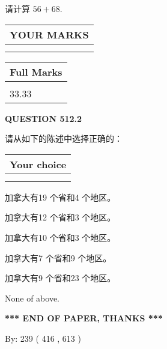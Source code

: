\documentclass{ctexart}
\begin{document}
  
 
请计算 $ %
56 +  %
68 $.
 

 

 
  
\vspace{0.2in}
  
\noindent\begin{tabular}{|l|}
\hline
 YOUR MARKS  \\
\hline
 \\ 
 \\ 
\hline
\end{tabular}
\hspace{0.05in} \begin{tabular}{|l|}
\hline
 Full Marks  \\
\hline
 \\ 
33.33 \\
\hline
\end{tabular}
{\textbf{\Large{QUESTION
512.2 
}}}
  
  
请从如下的陈述中选择正确的：
  
  
\noindent\hspace{3.0in} \begin{tabular}{|l|}
\hline
Your choice \\
\hline
 \\ 
 \\ 
\hline
\end{tabular}
  
  
 
 
加拿大有19 个省和4 个地区。
 
 
加拿大有12 个省和3 个地区。
 
 
加拿大有10 个省和3 个地区。
 
 
加拿大有7 个省和9 个地区。
 
 
加拿大有9 个省和23 个地区。
 
 
 None of above.
 
 
   
   
 \vspace{0.2in}
 
   
   
   
   
\vspace{1.0in} 
{\textbf{\large{ *** END OF PAPER, THANKS *** }}} 
   
   
\hspace{1.0in} By: 
 239 ( 416 ,  613 )
   
\end{document}
